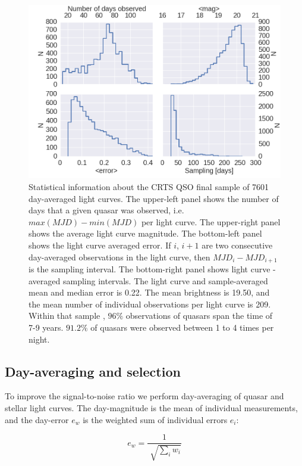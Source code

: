 \documentclass[fleqn,usenatbib]{mnras}  %
\begin{document}
\begin{figure}
\label{fig:CRTS_QSO_stats}
 \includegraphics[width=\columnwidth]{Fig_1_Stats_CRTS_QSO_used.png}
 \caption{Statistical information about the CRTS QSO final sample of 7601 day-averaged light curves. The upper-left panel shows the number of days that a given quasar was observed, i.e. $max(MJD)-min(MJD)$ per light curve. The upper-right panel shows the average light curve magnitude. The bottom-left panel shows the light curve averaged error. If $i$, $i+1$ are two consecutive day-averaged observations in the light curve, then $MJD_{i} - MJD_{i+1}$ is the sampling interval. The bottom-right panel shows light curve - averaged sampling intervals. The light curve and sample-averaged mean and median error is 0.22. The mean  brightness is 19.50, and the mean number of individual observations per light curve  is 209. Within that sample , $96 \% $ observations of quasars span the time of 7-9 years.  $91.2\%$ of  quasars were observed between 1 to 4 times per night.}
\end{figure}



\subsection{Day-averaging and selection}
\label{sec:sample_sel}


To improve the signal-to-noise ratio we perform day-averaging of quasar and stellar light curves. The day-magnitude is the mean of individual measurements, and the day-error $e_{w}$ is the weighted sum of individual errors $e_{i}$: 

\begin{equation}
 e_{w} = \frac{1}{\sqrt[]{\sum_{i} w_{i}}}
\end{equation}
\end{document}
